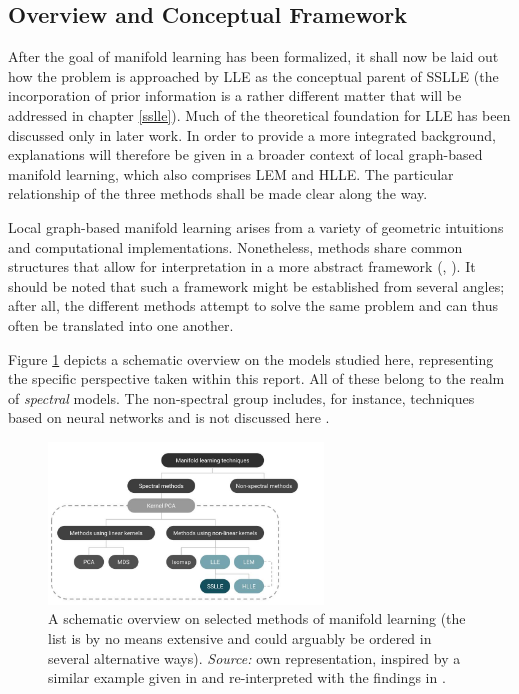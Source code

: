 \subsection{Overview and Conceptual Framework}
\label{principles-overview}

After the goal of manifold learning has been formalized, it shall now be laid 
out how the problem is approached by LLE as the conceptual parent of SSLLE 
(the incorporation of prior information is a rather different matter that will 
be addressed in chapter \ref{sslle}). 
Much of the theoretical foundation for LLE has been discussed only in later 
work.
In order to provide a more integrated background, explanations will therefore be 
given in a broader context of local graph-based manifold learning, which also 
comprises LEM and HLLE.
The particular relationship of the three methods shall be made clear along the 
way.

Local graph-based manifold learning arises from a variety of geometric 
intuitions and computational implementations.
Nonetheless, methods share common structures that allow for interpretation in a 
more abstract framework (\citet{bengioetal2003}, \citet{bengioetal2004}).
It should be noted that such a framework might be established from several 
angles; after all, the different methods attempt to solve the same problem 
and can thus often be translated into one another.

Figure \ref{fig:models-overview} depicts a schematic overview on the models 
studied here, representing the specific perspective taken within this report.
All of these belong to the realm of \textit{spectral} models.
The non-spectral group includes, for instance, techniques based on neural 
networks and is not discussed here \citep{vandermaatenetal2009}.

\begin{figure}[H]
    \centering
    \includegraphics[trim = 0 0 0 0, clip, %
      width = 0.65\textwidth]{figures/models-overview}
    \caption[Overview on selected manifold learning models]{A schematic overview 
    on selected methods of manifold learning (the list is by no means extensive 
    and could arguably be ordered in several alternative ways). 
    \textit{Source:} own representation, inspired by a similar example given in 
    \citet{vandermaatenetal2009} and re-interpreted with the findings in 
    \citet{bengioetal2004}.}
    \label{fig:models-overview}
  \end{figure}

